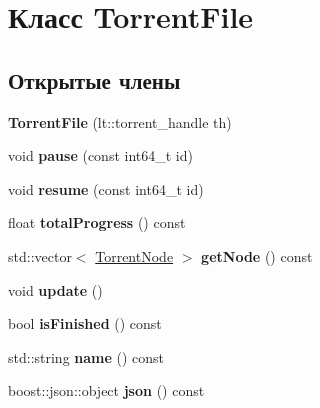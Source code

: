\hypertarget{class_torrent_file}{}\section{Класс Torrent\+File}
\label{class_torrent_file}
\subsection*{Открытые члены}
\begin{DoxyCompactItemize}
\item 
\mbox{\label{class_torrent_file_a27ce12d60a57cf1d96a11f8a0f577f10}} 
{\bfseries Torrent\+File} (lt\+::torrent\+\_\+handle th)
\item 
\mbox{\label{class_torrent_file_a6e6d855070b528ce105730cbc0978dd5}} 
void {\bfseries pause} (const int64\+\_\+t id)
\item 
\mbox{\label{class_torrent_file_a560df176eab6c5de04239bdfc543524c}} 
void {\bfseries resume} (const int64\+\_\+t id)
\item 
\mbox{\label{class_torrent_file_ad0ad60a81ee1c36ca141e0e567003a2d}} 
float {\bfseries total\+Progress} () const
\item 
\mbox{\label{class_torrent_file_a897f2b650fe0751f6f600da7b91554b7}} 
std\+::vector$<$ \hyperlink{struct_torrent_node}{Torrent\+Node} $>$ {\bfseries get\+Node} () const
\item 
\mbox{\label{class_torrent_file_addc6398cd278de5c1006243e69bc8939}} 
void {\bfseries update} ()
\item 
\mbox{\label{class_torrent_file_a2705d475c4d765e8c5f271d53749de38}} 
bool {\bfseries is\+Finished} () const
\item 
\mbox{\label{class_torrent_file_a24e7ea45aabbb85a63c9f52ca0124290}} 
std\+::string {\bfseries name} () const
\item 
\mbox{\label{class_torrent_file_acc06bd2ca7292b99f6293d71a48bd0ff}} 
boost\+::json\+::object {\bfseries json} () const

\end{DoxyCompactItemize}
